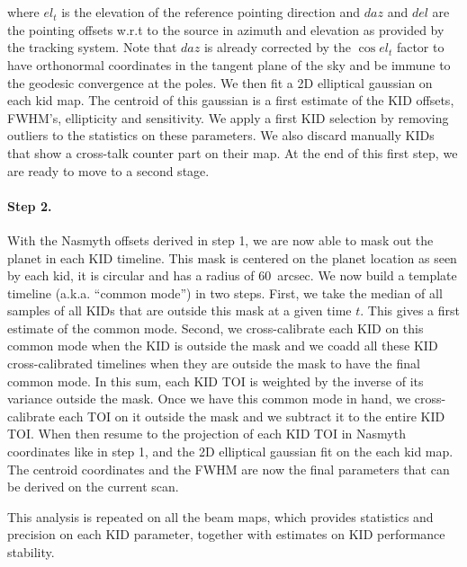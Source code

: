 \\
\\


where $el_t$ is the elevation of the reference pointing direction and $daz$ and
$del$ are the pointing offsets w.r.t to the source in azimuth and elevation as
provided by the tracking system. Note that $daz$ is already corrected by the
$\cos el_t$ factor to have orthonormal coordinates in the tangent plane of the sky
and be immune to the geodesic convergence at the poles. We then fit a 2D
elliptical gaussian on each kid map. The centroid of this gaussian is a first
estimate of the KID offsets, FWHM's, ellipticity and sensitivity. We apply a
first KID selection by removing outliers to the statistics on these
parameters. We also discard manually KIDs that show a cross-talk counter part on
their map. At the end of this first step, we are ready to move to a second
stage.

\paragraph{Step 2.} With the Nasmyth offsets derived in step 1, we are now able to
mask out the planet in each KID timeline. This mask is centered on the planet
location as seen by each kid, it is circular and has a radius of 60~arcsec. We
now build a template timeline (a.k.a. ``common mode'') in two steps. First, we
take the median of all samples of all KIDs that are outside this mask at a given
time $t$. This gives a first estimate of the common mode. Second, we
cross-calibrate each KID on this common mode when the KID is outside the mask
and we coadd all these KID cross-calibrated timelines when they are outside the
mask to have the final common mode. In this sum, each KID TOI is weighted by the
inverse of its variance outside the mask. Once we have this common mode in hand,
we cross-calibrate each TOI on it outside the mask and we subtract it to the
entire KID TOI. When then resume to the projection of each KID TOI in Nasmyth
coordinates like in step 1, and the 2D elliptical gaussian fit on the each kid
map. The centroid coordinates and the FWHM are now the final parameters that can
be derived on the current scan.

This analysis is repeated on all the beam maps, which provides statistics and
precision on each KID parameter, together with estimates on KID performance stability.

